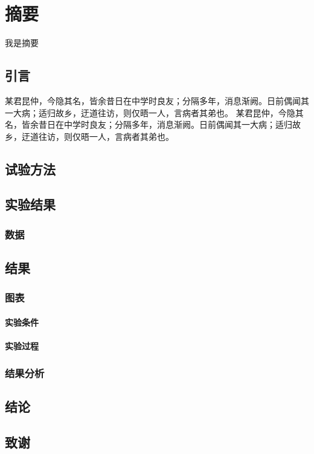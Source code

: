 \documentclass{ctexbook}%
\begin{document}
	\tableofcontents
	\chapter{摘要}
	我是摘要
	\section{引言}
	某君昆仲，今隐其名，皆余昔日在中学时良友；分隔多年，消息渐阙。日前偶闻其一大病；适归故乡，迂道往访，则仅晤一人，言病者其弟也。
	某君昆仲，今隐其名，皆余昔日在中学时良友；分隔多年，消息渐阙。日前偶闻其一大病；适归故乡，迂道往访，则仅晤一人，言病者其弟也。
	\section{试验方法}
	\section{实验结果}
	\subsection{数据}
	\section{结果}
	\subsection{图表}
	\subsubsection{实验条件}
	\subsubsection{实验过程}
	\subsection{结果分析}
	\section{结论}
	\section{致谢}
\end{document}

